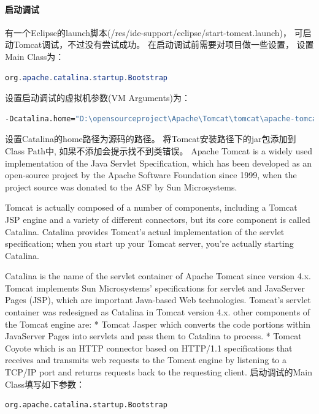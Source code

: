 \documentclass{book}
\begin{document}
\paragraph{启动调试}

有一个Eclipse的launch脚本(/res/ide-support/eclipse/start-tomcat.launch)，
可启动Tomcat调试，不过没有尝试成功。
在启动调试前需要对项目做一些设置，
设置Main Class为：

\begin{lstlisting}[language=Java]
org.apache.catalina.startup.Bootstrap
\end{lstlisting}

设置启动调试的虚拟机参数(VM Arguments)为：

\begin{lstlisting}[language=Bash]
-Dcatalina.home="D:\opensourceproject\Apache\Tomcat\tomcat\apache-tomcat-8.0.36-src\"
\end{lstlisting}

设置Catalina的home路径为源码的路径。
将Tomcat安装路径下的jar包添加到Class Path中,
如果不添加会提示找不到类错误。
Apache Tomcat is a widely used implementation of the Java Servlet Specification, 
which has been developed as an open-source project by the Apache Software Foundation since 1999, 
when the project source was donated to the ASF by Sun Microsystems.

Tomcat is actually composed of a number of components, 
including a Tomcat JSP engine and a variety of different connectors, but its core component is called Catalina. 
Catalina provides Tomcat's actual implementation of the servlet specification; 
when you start up your Tomcat server, you're actually starting Catalina.

Catalina is the name of the servlet container of Apache
Tomcat since version 4.x. Tomcat implements Sun
Microsystems' specifications for servlet and JavaServer
Pages (JSP), which are important Java-based Web technologies.
Tomcat's servlet container was redesigned as Catalina in
Tomcat version 4.x. 
other components of the Tomcat engine are:
* Tomcat Jasper which converts the code portions within
JavaServer Pages into servlets and pass them to Catalina to
process.
* Tomcat Coyote which is an HTTP connector based on
HTTP/1.1 specifications that receives and transmits web
requests to the Tomcat engine by listening to a TCP/IP port
and returns requests back to the requesting client.
启动调试的Main Class填写如下参数：

\begin{lstlisting}[language=Bash]
org.apache.catalina.startup.Bootstrap
\end{lstlisting}
\end{document}
